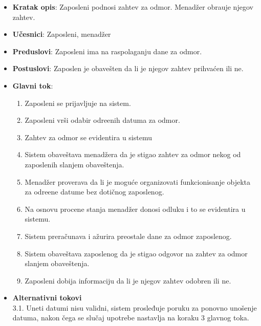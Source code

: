   
 \begin{itemize}
    \item \textbf{Kratak opis}:
   Zaposleni podnosi zahtev za odmor. Menad\v zer obra\dj uje njegov zahtev.
    \item \textbf{Učesnici}:
    Zaposleni, menad\v zer
    \item \textbf{Preduslovi}: Zaposleni ima na raspolaganju dane za odmor.
    \item \textbf{Postuslovi}:
    Zaposlen je obave\v sten da li je njegov zahtev prihva\'cen ili ne.
    \item \textbf{Glavni tok}:
    \begin{enumerate}
        \item Zaposleni se prijavljuje na sistem.
        \item Zaposleni vr\v si odabir odre\dj enih datuma za odmor.
        \item Zahtev za odmor se evidentira u sistemu 
        \item Sistem obave\v stava menad\v zera da je stigao zahtev za odmor nekog od zaposlenih slanjem obaveštenja.
        \item Menad\v zer proverava da li je moguće organizovati funkcionisanje objekta za odre\dj ene datume bez dotičnog zaposlenog.
        \item Na osnovu procene stanja menad\v zer donosi odluku i to se evidentira u sistemu.
        \item Sistem prera\v cunava i a\v zurira preostale dane za odmor zaposlenog.
        \item Sistem obave\v stava zaposlenog da je stigao odgovor na zahtev za odmor slanjem obaveštenja.
        \item Zaposleni dobija informaciju da li je njegov zahtev odobren ili ne.
    \end{enumerate}
\item \textbf{Alternativni tokovi}\\
        3.1. Uneti datumi nisu validni, sistem prosleđuje poruku za ponovno unošenje datuma, nakon čega se slučaj upotrebe nastavlja na koraku 3 glavnog toka.

 \end{itemize}
 
 
 
